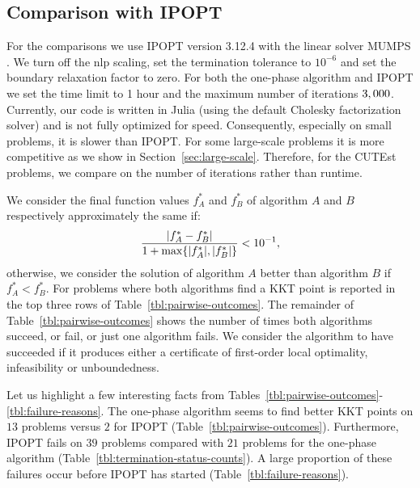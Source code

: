 \documentclass{article}
\begin{document}
\subsection{Comparison with IPOPT}\label{alg:comparison-IPOPT}


For the comparisons we use IPOPT version 3.12.4 with the linear solver MUMPS \cite{amestoy1998mumps}. We turn off the nlp scaling, set the termination tolerance to $10^{-6}$ and set the boundary relaxation factor to zero. For both the one-phase algorithm and IPOPT we set the time limit to 1 hour and the maximum number of iterations $3,000$. Currently, our code is written in Julia (using the default Cholesky factorization solver) and is not fully optimized for speed. Consequently, especially on small problems, it is slower than IPOPT. For some large-scale problems it is more competitive as we show in Section~\ref{sec:large-scale}. Therefore, for the CUTEst problems, we compare on the number of iterations rather than runtime. 



We consider the final function values $f_{A}^{*}$ and $f_{B}^{*}$ of algorithm $A$ and $B$ respectively approximately the same if:
$$
\frac{\abs{f_{A}^{*} - f_{B}^{*}}}{1 + \max \{ | f_{A}^{*} |, | f_{B}^{*} | \} } < 10^{-1},
$$
otherwise, we consider the solution of algorithm $A$ better than algorithm $B$ if $f_{A}^{*}  < f_{B}^{*}$. For problems where both algorithms find a KKT point is reported in the top three rows of Table~\ref{tbl:pairwise-outcomes}. The remainder of Table~\ref{tbl:pairwise-outcomes} shows the number of times both algorithms succeed, or fail, or just one algorithm fails. We consider the algorithm to have succeeded if it produces either a certificate of first-order local optimality, infeasibility or unboundedness. 

Let us highlight a few interesting facts from Tables~\ref{tbl:pairwise-outcomes}-\ref{tbl:failure-reasons}. The one-phase algorithm seems to find better KKT points on $13$ problems versus $2$ for IPOPT (Table~\ref{tbl:pairwise-outcomes}). Furthermore, IPOPT fails on $39$ problems compared with $21$ problems for the one-phase algorithm (Table~\ref{tbl:termination-status-counts}). A large proportion of these failures occur before IPOPT has started (Table~\ref{tbl:failure-reasons}).
\end{document}
